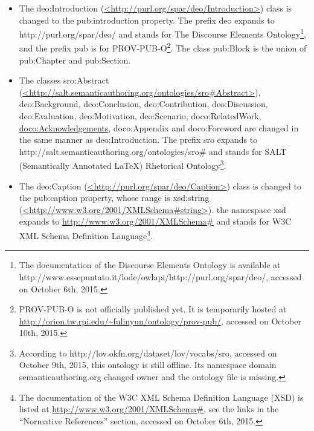 \begin{itemize}
	\item The deo:Introduction (\url{<http://purl.org/spar/deo/Introduction>}) class is changed to the pub:introduction property. The prefix deo expands to http://purl.org/spar/deo/ and stands for The Discourse Elements Ontology\footnote{The documentation of the Discourse Elements Ontology is available at http://www.essepuntato.it/lode/owlapi/http://purl.org/spar/deo/, accessed on October 6th, 2015.}, and the prefix pub is for PROV-PUB-O\footnote{PROV-PUB-O is not officially published yet. It is temporarily hosted at \url{http://orion.tw.rpi.edu/~fulinyun/ontology/prov-pub/}, accessed on October 10th, 2015.}. The class pub:Block is the union of pub:Chapter and pub:Section.
	\item The classes sro:Abstract (\url{<http://salt.semanticauthoring.org/ontologies/sro#Abstract>}), deo:Background, deo:Conclusion, deo:Contribution, deo:Discussion, deo:Evaluation, deo:Motivation, deo:Scenario, doco:RelatedWork, \url{doco:Acknowledgements}, doco:Appendix and doco:Foreword are changed in the same manner as deo:Introduction. The prefix sro expands to  http://salt.semanticauthoring.org/ontologies/sro\# and stands for SALT (Semantically Annotated \LaTeX \cite{groza2007salt}) Rhetorical Ontology\footnote{According to http://lov.okfn.org/dataset/lov/vocabs/sro, accessed on October 9th, 2015, this ontology is still offline. Its namespace domain semanticauthoring.org changed owner and the ontology file is missing.}.
	\item The deo:Caption (\url{<http://purl.org/spar/deo/Caption>}) class is changed to the pub:caption property, whose range is xsd:string (\url{<http://www.w3.org/2001/XMLSchema#string>}).  the namespace xsd expands to \url{http://www.w3.org/2001/XMLSchema#} and stands for W3C XML Schema Definition Language\footnote{The documentation of the W3C XML Schema Definition Language (XSD) is listed at \url{http://www.w3.org/2001/XMLSchema#}, see the links in the ``Normative References'' section, accessed on October 6th, 2015.}.

\end{itemize}
